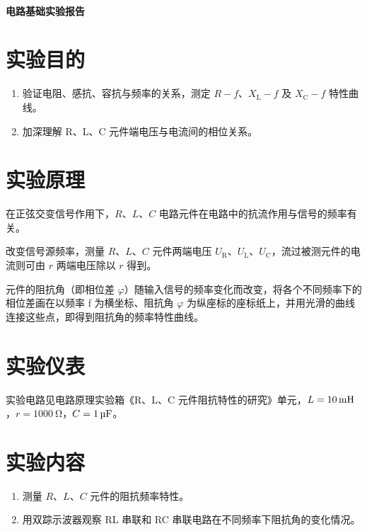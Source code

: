 \documentclass[a4paper,utf8]{article}
\begin{document}
\begin{center}
    {\mbox{}\\[7em]\bfseries\songti%
    电路基础实验报告}\\[34mm]
\end{center}
\newpage

\section{实验目的}
    \begin{enumerate}
        \item 验证电阻、感抗、容抗与频率的关系，测定 $R-f$、$X_\text{L}-f$ 及 $X_\text{C}-f$ 特性曲线。
        \item 加深理解 R、L、C 元件端电压与电流间的相位关系。
    \end{enumerate}

\section{实验原理}%
    在正弦交变信号作用下，$R$、$L$、$C$ 电路元件在电路中的抗流作用与信号的频率有关。\par
    改变信号源频率，测量 $R$、$L$、$C$ 元件两端电压 $U_\text{R}$、$U_\text{L}$、$U_\text{C}$，流过被测元件的电流则可由 $r$ 两端电压除以 $r$ 得到。\par
    元件的阻抗角（即相位差 $\varphi$）随输入信号的频率变化而改变，将各个不同频率下的相位差画在以频率 f 为横坐标、阻抗角 $\varphi$ 为纵座标的座标纸上，并用光滑的曲线连接这些点，即得到阻抗角的频率特性曲线。 

\section{实验仪表}
    实验电路见电路原理实验箱《R、L、C 元件阻抗特性的研究》单元，$L=\SI{10}{\mH}$，$r=\SI{1000}{\ohm}$，$C=\SI{1}{\uF}$。

\section{实验内容}
    \begin{enumerate}
        \item 测量 $R$、$L$、$C$ 元件的阻抗频率特性。
        \item 用双踪示波器观察 RL 串联和 RC 串联电路在不同频率下阻抗角的变化情况。
    \end{enumerate}
\end{document}
